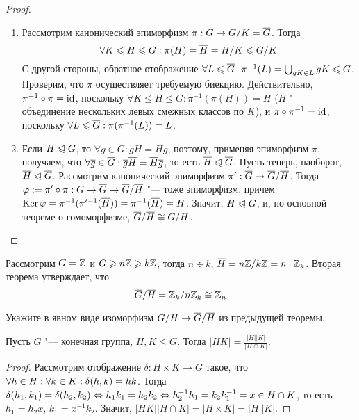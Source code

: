 \begin{proof}~
	\begin{enumerate}
		\item Рассмотрим канонический эпиморфизм $\pi: G \to G / K = \overline{G}$. Тогда
		\[
			\forall K \leqslant H \leqslant G: \pi(H) =\overline{H} = H / K \leqslant G / K
		\]
		С другой стороны, обратное отображение $\forall L \le \ol{G}\ \ \pi^{-1}(L) = \bigcup_{gK \in L}gK \hm\le G$. Проверим, что $\pi$ осуществляет требуемую биекцию. Действительно, $\pi^{-1}\circ\pi \hm= \id$, поскольку $\forall K \le H \le G: \pi^{-1}(\pi(H)) = H$ ($H$ "--- объединение нескольких левых смежных классов по $K$), и $\pi\circ\pi^{-1} = \operatorname{id}$, поскольку $\forall L \leqslant \overline{G}: \pi(\pi^{-1}(L)) = L$.
		
		\item Если $H \trianglelefteqslant G$, то $\forall g \in G: gH = Hg$, поэтому, применяя эпиморфизм $\pi$, получаем, что $\forall \overline{g} \in \overline{G}: \overline{g}\overline{H} = \overline{H}\overline{g}$, то есть $\overline{H} \trianglelefteqslant \overline{G}$. Пусть теперь, наоборот, $\overline{H} \trianglelefteqslant \overline{G}$. Рассмотрим канонический эпиморфизм $\pi': \overline{G} \to \overline{G} / \overline{H}$. Тогда $\phi := \pi'\circ\pi: G \hm\to \ol{G} \hm\to \ol{G} / \ol{H}$ "--- тоже эпиморфизм, причем $\ke \phi = \pi^{-1}(\pi'^{-1}(\ol{H})) \hm= \pi^{-1}(\ol{H}) = H$. Значит, $H \trianglelefteqslant G$, и, по основной теореме о гомоморфизме, $\overline{G} / \overline{H} \cong G / H$.
	\end{enumerate}
\end{proof}

\begin{example}
	Рассмотрим $G = \mathbb{Z}$ и $G \geqslant n\mathbb{Z} \geqslant k\mathbb{Z}$, тогда $n \div k$, $\overline{H} = n\mathbb{Z} / k\mathbb{Z} = n \cdot \mathbb{Z}_k$. Вторая теорема утверждает, что
	\[
		\overline{G} / \overline{H} = \mathbb{Z}_k / n\mathbb{Z}_k \cong \mathbb{Z}_n
	\]
\end{example}

\begin{exercise}
	Укажите в явном виде изоморфизм $G / H \hm\to \ol{G} / \ol{H}$ из предыдущей теоремы.
\end{exercise}

\begin{proposition}
	Пусть $G$ "--- конечная группа, $H, K \le G$. Тогда $|HK| = \frac{|H||K|}{|H\cap K|}$.
\end{proposition}

\begin{proof}
	Рассмотрим отображение $\delta: H\times K \to G$ такое, что $\forall h \hm\in H: \forall k \in K: \delta(h, k) = hk$. Тогда $\delta(h_1, k_1) = \delta(h_2, k_2) \hm\Leftrightarrow h_1k_1 = h_2k_2 \hm\Leftrightarrow h_2^{-1}h_1 = k_2k_1^{-1} = x \in H \cap K$, то есть $h_1 = h_2x$, $k_1 = x^{-1}k_2$. Значит, $|HK||H \cap K| = |H \times K| = |H||K|$.
\end{proof}